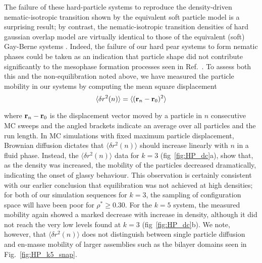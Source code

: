 \documentclass[%
reprint,
superscriptaddress,
showpacs,
 amsmath,amssymb,
 aps,
floatfix,
]{revtex4-1}
\begin{document}
The failure of these hard-particle systems to reproduce the density-driven nematic-isotropic
transition shown by the equivalent soft particle model is a surprising result; by contrast, the
nematic-isotropic transition densities of hard gaussian overlap model \cite{DeMiguelDelRio01}
are virtually identical to those of the equivalent (soft) Gay-Berne systems
\cite{DeMiguel_Rull_91,DeMiguel_Rull_91a}. Indeed, the failure of our hard pear systems to form
nematic phases could be taken as an indication that particle shape did not contribute
significantly to the mesophase formation processes seen in Ref.~\cite{Berardi_Ricci_01}. To
assess both this and the non-equilibration noted above, we have measured the particle mobility
in our systems by computing the mean square displacement
\begin{equation}
        \langle\delta r^2(n)\rangle  = \langle({\bf r}_n - {\bf r}_0)^2\rangle
\end{equation}

%
where ${\bf r}_n - {\bf r}_0$ is the displacement vector moved by a particle in $n$ consecutive
MC sweeps and the angled brackets indicate an average over all particles and the run length. In
MC simulations with fixed maximum particle displacement, Brownian diffusion dictates that
$\langle\delta r^2(n)\rangle$ should increase linearly with $n$ in a fluid phase. Instead, the
$\langle\delta r^2(n)\rangle$ data for $k=3$ (fig~\ref{fig:HP_dc}a), show that, as the density
was increased, the mobility of the particles decreased dramatically, indicating the onset of
glassy behaviour. This observation is certainly consistent with our earlier conclusion that
equilibration was not achieved at high densities; for both of our simulation sequences for
$k=3$, the sampling of configuration space will have been poor for $\rho^{*} \geq 0.30$. For the
$k=5$ system, the measured mobility again showed a marked decrease with increase in density,
although it did not reach the very low levels found at $k=3$ (fig~\ref{fig:HP_dc}b). We note,
however, that $\langle\delta r^2(n)\rangle$ does not distinguish between single particle
diffusion and en-masse mobility of larger assemblies such as the bilayer domains seen in
Fig.~\ref{fig:HP_k5_snap}.
\end{document}
